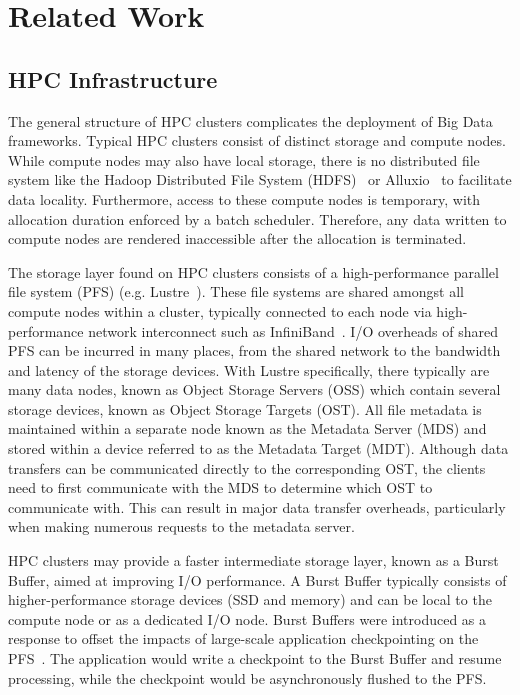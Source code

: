 \documentclass[10pt,journal,compsoc]{IEEEtran}
\begin{document}
\section{Related Work}
\subsection{HPC Infrastructure}
      The general structure of HPC clusters complicates the deployment of Big
      Data frameworks. Typical HPC clusters consist of distinct storage and
      compute nodes. While compute nodes may also have local storage, there is
      no distributed file system like the Hadoop Distributed File System
      (HDFS)~\cite{shvachko2010hadoop} or Alluxio~\cite{alluxio} to facilitate
      data locality. Furthermore, access to these compute nodes is temporary,
      with allocation duration enforced by a batch scheduler. Therefore, any
      data written to compute nodes are rendered inaccessible after the
      allocation is terminated.

      The storage layer found on HPC clusters consists of a high-performance
      parallel file system (PFS) (e.g. Lustre~\cite{lustre}). These file systems
      are shared amongst all compute nodes within a cluster, typically connected
      to each node via high-performance network interconnect such as
      InfiniBand~\cite{infiniband}. I/O overheads of shared PFS can be incurred
      in many places, from the shared network to the bandwidth and latency of
      the storage devices.  With Lustre specifically, there typically are many
      data nodes, known as Object Storage Servers (OSS) which contain several
      storage devices, known as Object Storage Targets (OST). All file metadata
      is maintained within a separate node known as the Metadata Server (MDS)
      and stored within a device referred to as the Metadata Target (MDT).
      Although data transfers can be communicated directly to the corresponding
      OST, the clients need to first communicate with the MDS to determine which
      OST to communicate with. This can result in major data transfer overheads,
      particularly when making numerous requests to the metadata server.
      
      
      HPC clusters may provide a faster intermediate storage layer, known as a
      Burst Buffer, aimed at improving I/O performance. A Burst Buffer typically
      consists of higher-performance storage devices (SSD and memory) and can be
      local to the compute node or as a dedicated I/O node. Burst Buffers were
      introduced as a response to offset the impacts of large-scale application
      checkpointing on the PFS~\cite{bb}. The application would write a
      checkpoint to the Burst Buffer and resume processing, while the checkpoint
      would be asynchronously flushed to the PFS. 
\end{document}
